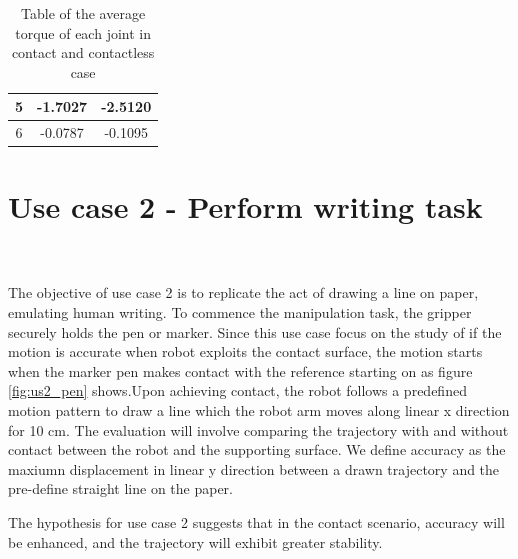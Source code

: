 \documentclass[report.tex]{subfiles}
\begin{document}
\begin{table}[H]
\begin{tabular}{c|c|c|}
    \multicolumn{1}{|c|}{5}     & -1.7027                                                      & -2.5120                                                      \\ \hline
    \multicolumn{1}{|c|}{6}     & -0.0787                                                      & -0.1095                                                      \\ \hline
    \end{tabular}%
    \caption{Table of the average torque of each joint in contact and contactless case}
    \label{tab:us1_table_torque}
    \end{table}
    \newpage
    \section{Use case 2 - Perform writing task}
    \paragraph{\\}
    The objective of use case 2 is to replicate the act of drawing a line on paper, emulating human writing. To commence the manipulation task, the gripper securely holds the pen or marker. Since this use case focus on the study of if the motion is accurate when robot exploits the contact surface, the motion starts when the marker pen makes contact with the reference starting on as figure \ref{fig:us2_pen} shows.Upon achieving contact, the robot follows a predefined motion pattern to draw a line which the robot arm moves along linear x direction for 10 cm.
    The evaluation will involve comparing the trajectory with and without contact between the robot and the supporting surface. We define accuracy as the maxiumn displacement in linear y direction between a drawn trajectory and the pre-define straight line on the paper.
    
    The hypothesis for use case 2 suggests that in the contact scenario, accuracy will be enhanced, and the trajectory will exhibit greater stability.
    \raggedbottom
\end{document}
